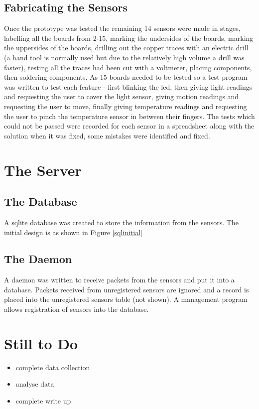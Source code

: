 \documentclass[bsc,frontabs,twoside,singlespacing,parskip,deptreport]{infthesis}
\begin{document}
\subsection{Fabricating the Sensors}
Once the prototype was tested the remaining 14 sensors were made in stages, labelling all the boards from 2-15, marking the undersides of the boards, marking the uppersides of the boards, drilling out the copper traces with an electric drill (a hand tool is normally used but due to the relatively high volume a drill was faster), testing all the traces had been cut with a voltmeter, placing components, then soldering components. As 15 boards needed to be tested so a test program was written to test each feature - first blinking the led, then giving light readings and requesting the user to cover the light sensor, giving motion readings and requesting the user to move, finally giving temperature readings and requesting the user to pinch the temperature sensor in between their fingers. The tests which could not be passed were recorded for each sensor in a spreadsheet along with the solution when it was fixed, some mistakes were identified and fixed. 

\section{The Server}
\subsection{The Database}
A sqlite database was created to store the information from the sensors. The initial design is as shown in Figure \ref{sqlinitial} 

\subsection{The Daemon}
A daemon was written to receive packets from the sensors and put it into a database. Packets received from unregistered sensors are ignored and a record is placed into the unregistered sensors table (not shown). A management program allows registration of sensors into the database. 

\section{Still to Do}

\begin{itemize}
	\item complete data collection
	\item analyse data 
	\item complete write up
\end{itemize}
\end{document}
